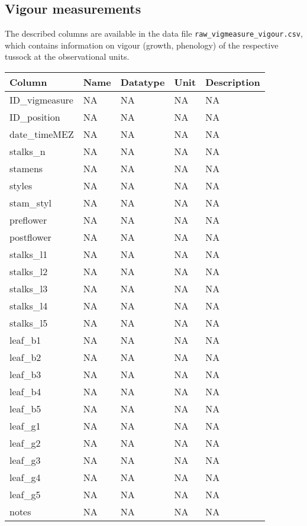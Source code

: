 \documentclass[
]{book}
\begin{document}
\hypertarget{vigour-measurements}{%
\subsection{Vigour measurements}\label{vigour-measurements}}

The described columns are available in the data file \texttt{raw\_vigmeasure\_vigour.csv}, which contains information on vigour (growth, phenology) of the respective tussock at the observational units.

\begin{tabular}{lllll}
\toprule
Column & Name & Datatype & Unit & Description\\
\midrule
ID\_vigmeasure & NA & NA & NA & NA\\
ID\_position & NA & NA & NA & NA\\
date\_timeMEZ & NA & NA & NA & NA\\
stalks\_n & NA & NA & NA & NA\\
stamens & NA & NA & NA & NA\\
\addlinespace
styles & NA & NA & NA & NA\\
stam\_styl & NA & NA & NA & NA\\
preflower & NA & NA & NA & NA\\
postflower & NA & NA & NA & NA\\
stalks\_l1 & NA & NA & NA & NA\\
\addlinespace
stalks\_l2 & NA & NA & NA & NA\\
stalks\_l3 & NA & NA & NA & NA\\
stalks\_l4 & NA & NA & NA & NA\\
stalks\_l5 & NA & NA & NA & NA\\
leaf\_b1 & NA & NA & NA & NA\\
\addlinespace
leaf\_b2 & NA & NA & NA & NA\\
leaf\_b3 & NA & NA & NA & NA\\
leaf\_b4 & NA & NA & NA & NA\\
leaf\_b5 & NA & NA & NA & NA\\
leaf\_g1 & NA & NA & NA & NA\\
\addlinespace
leaf\_g2 & NA & NA & NA & NA\\
leaf\_g3 & NA & NA & NA & NA\\
leaf\_g4 & NA & NA & NA & NA\\
leaf\_g5 & NA & NA & NA & NA\\
notes & NA & NA & NA & NA\\
\bottomrule
\end{tabular}
\end{document}
